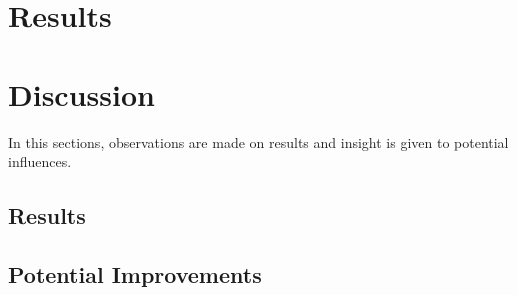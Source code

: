 \documentclass[conference]{IEEEtran}
\begin{document}
\section{Results} \label{Results}








\section{Discussion} \label{Discussion}
In this sections, observations are made on results and insight is given to potential influences.

\subsection{Results}



\subsection{Potential Improvements}
\end{document}
